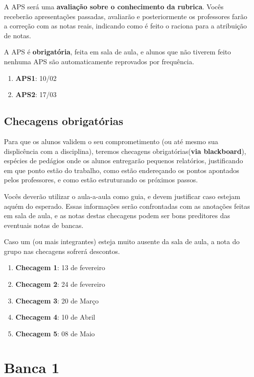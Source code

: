 \documentclass[a4paper,12pt]{article}[abnt2]
\begin{document}
A APS será uma \textbf{avaliação sobre o conhecimento da rubrica}. Vocês receberão apresentações passadas, avaliarão e posteriormente os professores farão a correção com as notas reais, indicando como é feito o raciona para a atribuição de notas. 

A APS é \textbf{obrigatória}, feita em sala de aula, e alunos que não tiverem feito nenhuma APS são automaticamente reprovados por frequência.\begin{enumerate}
    \item \textbf{APS1}: 10/02
    \item \textbf{APS2}: 17/03
\end{enumerate} 

\subsection{\textbf{Checagens obrigatórias}}

Para que os alunos validem o seu comprometimento (ou até mesmo sua displicência com a disciplina), teremos checagens obrigatórias(\textbf{via blackboard}), espécies de pedágios onde os alunos entregarão pequenos relatórios, justificando em que ponto estão do trabalho, como estão endereçando os pontos apontados pelos professores, e como estão estruturando os próximos passos. 

Vocês deverão utilizar o aula-a-aula como guia, e devem justificar caso estejam aquém do esperado. Essas informações serão confrontadas com as anotações feitas em sala de aula, e as notas destas checagens podem ser bons preditores das eventuais notas de bancas.

Caso um (ou mais integrantes) esteja muito ausente da sala de aula, a nota do grupo nas checagens sofrerá descontos.

\begin{enumerate}
    \item \textbf{Checagem 1}: 13 de fevereiro
    \item \textbf{Checagem 2}: 24 de fevereiro
    \item \textbf{Checagem 3}: 20 de Março
    \item \textbf{Checagem 4}: 10 de Abril
    \item \textbf{Checagem 5}: 08 de Maio
\end{enumerate}

\newpage
\section{\textbf{Banca 1}}
\end{document}
